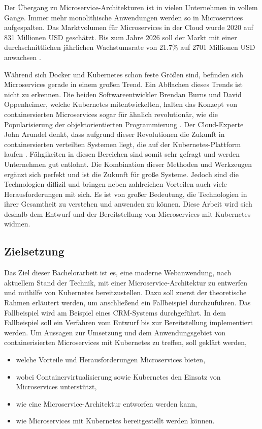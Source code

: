 Der Übergang zu Microservice-Architekturen ist in vielen Unternehmen in vollem Gange. Immer mehr monolithische Anwendungen werden so in Microservices aufgespalten. Das Marktvolumen für Microservices in der Cloud wurde 2020 auf 831 Millionen \ac{USD} geschätzt. Bis zum Jahre 2026 soll der Markt mit einer durchschnittlichen jährlichen Wachstumsrate von 21.7\%  auf 2701 Millionen \ac{USD} anwachsen \parencite[vgl.][S. 7]{mordorintelligenceGlobal2020}.

Während sich Docker und Kubernetes schon feste Größen sind, befinden sich Microservices gerade in einem großen Trend. Ein Abflachen dieses Trends ist nicht zu erkennen. Die beiden Softwareentwickler Brendan Burns und David Oppenheimer, welche Kubernetes mitentwickelten, halten das Konzept von containersierten Microservices sogar für ähnlich revolutionär, wie die Popularisierung der objektorientierten Programmierung \parencite[vgl.][S. 1]{burnsDesign2016}. Der Cloud-Experte John Arundel denkt, dass aufgrund dieser Revolutionen die Zukunft in containersierten verteilten Systemen liegt, die auf der Kubernetes-Plattform laufen \parencite[vgl.][S. 1]{arundelCloud2019}. Fähgikeiten in diesen Bereichen sind somit sehr gefragt und werden Unternehmen gut entlohnt. Die Kombination dieser Methoden und Werkzeugen ergänzt sich perfekt und ist die Zukunft für große Systeme. Jedoch sind die Technologien diffizil und bringen neben zahlreichen Vorteilen auch viele Herausforderungen mit sich. Es ist von großer Bedeutung, die Technologien in ihrer Gesamtheit zu verstehen und anwenden zu können. Diese Arbeit wird sich deshalb dem Entwurf und der Bereitstellung von Microservices mit Kubernetes widmen.
  
\subsection{Zielsetzung}
Das Ziel dieser Bachelorarbeit ist es, eine moderne Webanwendung, nach aktuellem Stand der Technik, mit einer Microservice-Architektur zu entwerfen und mithilfe von Kubernetes bereitzustellen. Dazu soll zuerst der theoretische Rahmen erläutert werden, um anschließend ein Fallbeispiel durchzuführen. Das Fallbeispiel wird am Beispiel eines \ac{CRM}-Systems durchgeführt. In dem Fallbeispiel soll ein Verfahren vom Entwurf bis zur Bereitstellung implementiert werden. Um Aussagen zur Umsetzung und dem Anwendungsgebiet von containerisierten Microservices mit Kubernetes zu treffen, soll geklärt werden, 

\begin{itemize}
\item welche Vorteile und Herausforderungen Microservices bieten,
\item wobei Containervirtualisierung sowie Kubernetes den Einsatz von Microservices unterstützt,
\item wie eine Microservice-Architektur entworfen werden kann,
\item wie Microservices mit Kubernetes bereitgestellt werden können.
\end{itemize}

